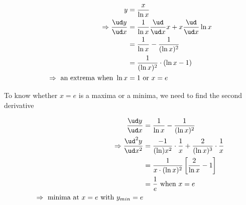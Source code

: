 \begin{solution}[\fullpage]
	\begin{align}
	   y &= \dfrac{x}{\ln x} \\
	   \Rightarrow \dfrac{\ud y}{\ud x} &= \dfrac{1}{\ln x}\dfrac{\ud}{\ud x}x 
	             + x\dfrac{\ud}{\ud x}\ln x \\
	     &= \dfrac{1}{\ln x} - \dfrac{1}{(\ln x)^2} \\
	     &= \dfrac{1}{(\ln x)^2}\cdot(\ln x - 1) \\
	     \Rightarrow \text{ an extrema when } \ln x &= 1 \text{ or } x = e
	\end{align}
	
	To know whether $x=e$ is a maxima or a minima, we need to find the second derivative
	
	\begin{align}
	   \dfrac{\ud y}{\ud x} &= \dfrac{1}{\ln x} - \dfrac{1}{(\ln x)^2} \\
	   \Rightarrow \dfrac{\ud^2 y}{\ud x^2} &= \dfrac{-1}{(\ln)x^2}\cdot\dfrac{1}{x}
	                                        + \dfrac{2}{(\ln x)^3}\cdot\dfrac{1}{x} \\
	               &= \dfrac{1}{x\cdot(\ln x)^2}\left[ \dfrac{2}{\ln x} - 1\right] \\
	               &= \dfrac{1}{e} \text{ when } x = e \\
	               \Rightarrow \text{ minima at } x = e \text{ with } y_{min} = e
	\end{align}
\end{solution}
